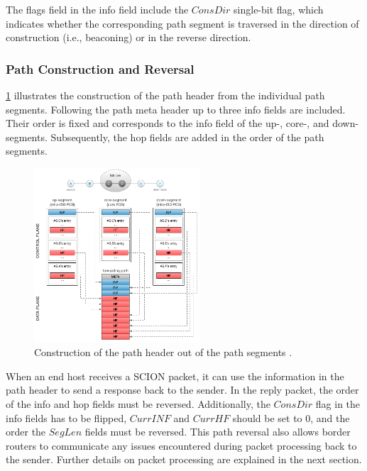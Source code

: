 The flags field in the info field include the $ConsDir$ single-bit flag, which indicates whether the corresponding path segment is traversed in the direction of construction (i.e., beaconing) or in the reverse direction.

\newpage
\subsubsection{Path Construction and Reversal}

\cref{fig:scion_path_header_contruction} illustrates the construction of the path header from the individual path segments.
Following the path meta header up to three info fields are included.
Their order is fixed and corresponds to the info field of the up-, core-, and down-segments.
Subsequently, the hop fields are added in the order of the path segments.

\begin{figure}[H]
    \centering
    \includegraphics[width=0.55\textwidth]{figures/scion_path_header_construction.png}
    \caption{Construction of the path header out of the path segments \cite[Section 5.4]{Perrig2022}.}
    \label{fig:scion_path_header_contruction}
\end{figure}

When an end host receives a SCION packet, it can use the information in the path header to send a response back to the sender.
In the reply packet, the order of the info and hop fields must be reversed.
Additionally, the $ConsDir$ flag in the info fields has to be flipped, $CurrINF$ and $CurrHF$ should be set to 0, and the order the $SegLen$ fields must be reversed.
This path reversal also allows border routers to communicate any issues encountered during packet processing back to the sender.
Further details on packet processing are explained in the next section.

